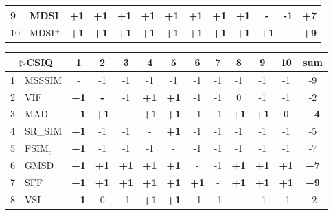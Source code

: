 \begin{table*}[htb]
{\begin{tabular}{|l|l|c|c|c|c|c|c|c|c|c|c||c|}
9           & MDSI            & \textbf{+1} & \textbf{+1} & \textbf{+1} & \textbf{+1} & \textbf{+1} & \textbf{+1} & \textbf{+1} & \textbf{+1} & -           & -1 & \textbf{+7} \\ \hline
10          & MDSI$^+$           & \textbf{+1} & \textbf{+1} & \textbf{+1} & \textbf{+1} & \textbf{+1} & \textbf{+1} & \textbf{+1} & \textbf{+1} & \textbf{+1} & -  & \textbf{+9} \\ \hline
\end{tabular}
\hspace*{2 mm}
\begin{tabular}{|l|l|c|c|c|c|c|c|c|c|c|c||c|}
\hline
\multicolumn{2}{|c|}{$\rhd$CSIQ} & 1           & 2           & 3           & 4           & 5           & 6           & 7  & 8           & 9           & 10          & sum         \\ \hline
1         & MSSSIM         & -           & -1          & -1          & -1          & -1          & -1          & -1 & -1          & -1          & -1          & -9          \\ \hline
2         & VIF            & \textbf{+1} & \textbf{-}  & -1          & \textbf{+1} & \textbf{+1} & -1          & -1 & 0           & -1          & -1          & -2          \\ \hline
3         & MAD            & \textbf{+1} & \textbf{+1} & -           & \textbf{+1} & \textbf{+1} & -1          & -1 & \textbf{+1} & \textbf{+1} & 0           & \textbf{+4} \\ \hline
4         & SR\_SIM        & \textbf{+1} & -1          & -1          & -           & \textbf{+1} & -1          & -1 & -1          & -1          & -1          & -5          \\ \hline
5         & FSIM$_c$          & \textbf{+1} & -1          & -1          & -1          & -           & -1          & -1 & -1          & -1          & -1          & -7          \\ \hline
6         & GMSD           & \textbf{+1} & \textbf{+1} & \textbf{+1} & \textbf{+1} & \textbf{+1} & -           & -1 & \textbf{+1} & \textbf{+1} & \textbf{+1} & \textbf{+7} \\ \hline
7         & SFF            & \textbf{+1} & \textbf{+1} & \textbf{+1} & \textbf{+1} & \textbf{+1} & \textbf{+1} & -  & \textbf{+1} & \textbf{+1} & \textbf{+1} & \textbf{+9} \\ \hline
8         & VSI            & \textbf{+1} & 0           & -1          & \textbf{+1} & \textbf{+1} & -1          & -1 & -           & -1          & -1          & -2          \\ \hline

\end{tabular}}
\end{table*}
